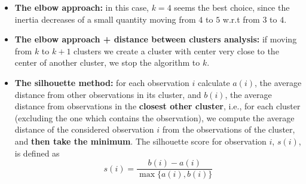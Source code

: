 \begin{itemize}
    \item \textbf{The elbow approach:} in this case, $k=4$ seems the best choice, since the inertia decreases of a small quantity moving from $4$ to $5$ w.r.t from $3$ to $4$.
    \item \textbf{The elbow approach + distance between clusters analysis:} if moving from $k$ to $k+1$ clusters we create a cluster with center very close to the center of another cluster, we stop the algorithm to $k$.
    \item \textbf{The silhouette method:} for each observation $i$ calculate $a( i)$, the average distance from other observations in its cluster, and $b( i)$, the average distance from observations in the \textbf{closest other cluster}, i.e., for each cluster (excluding the one which contains the observation), we compute the average distance of the considered observation $i$ from the observations of the cluster, and \textbf{then take the minimum}. The silhouette score for observation $i$, $s( i)$, is defined as
          \begin{equation*}
              s( i) =\frac{b( i) -a( i)}{\max\{a( i) ,b( i)\}}
          \end{equation*}
          

\end{itemize}
